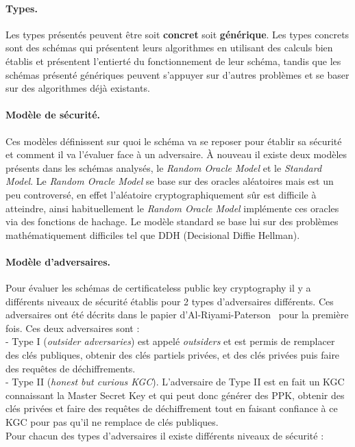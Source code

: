 \paragraph*{Types.}Les types présentés peuvent être soit \textbf{concret} soit \textbf{générique}. Les types concrets sont des schémas qui présentent leurs algorithmes en utilisant des calculs bien établis et présentent l'entierté du fonctionnement de leur schéma, tandis que les schémas présenté génériques peuvent s'appuyer sur d'autres problèmes et se baser sur des algorithmes déjà existants.\\
\paragraph*{Modèle de sécurité.} Ces modèles définissent sur quoi le schéma va se reposer pour établir sa sécurité et comment il va l'évaluer face à un adversaire. À nouveau il existe deux modèles présents dans les schémas analysés, le \textit{Random Oracle Model} et le \textit{Standard Model}. Le \textit{Random Oracle Model} se base sur des oracles aléatoires mais est un peu controversé, en effet l'aléatoire cryptographiquement sûr est difficile à atteindre, ainsi habituellement le \textit{Random Oracle Model} implémente ces oracles via des fonctions de hachage. Le modèle standard se base lui sur des problèmes mathématiquement difficiles tel que DDH (Decisional Diffie Hellman). \\
\paragraph*{Modèle d'adversaires.}
Pour évaluer les schémas de certificateless public key cryptography il y a différents niveaux de sécurité établis pour 2 types d'adversaires différents. Ces adversaires ont été décrits dans le papier d'Al-Riyami-Paterson~\cite{DBLP:conf/asiacrypt/Al-RiyamiP03} pour la première fois. Ces deux adversaires sont :\\
- Type I (\textit{outsider adversaries}) est appelé \textit{outsiders} et est permis de remplacer des clés publiques, obtenir des clés partiels privées, et des clés privées puis faire des requêtes de déchiffrements.\\
- Type II (\textit{honest but curious KGC}). L'adversaire de Type II est en fait un KGC connaissant la Master Secret Key et qui peut donc générer des PPK, obtenir des clés privées et faire des requêtes de déchiffrement tout en faisant confiance à ce KGC pour pas qu'il ne remplace de clés publiques.\\
Pour chacun des types d'adversaires il existe différents niveaux de sécurité :\\
